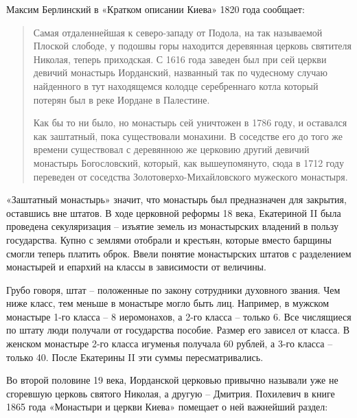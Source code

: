 Максим Берлинский в «Кратком описании Киева» 1820 года сообщает:

\begin{quotation}
Самая отдаленнейшая к северо-западу от Подола, на так называемой Плоской слободе, у подошвы горы находится деревянная церковь святителя Николая, теперь приходская. С 1616 года заведен был при сей церкви девичий монастырь Иорданский, названный так по чудесному случаю найденного в тут находящемся колодце серебреннаго котла который потерян был в реке Иордане в Палестине. 

Как бы то ни было, но монастырь сей уничтожен в 1786  году, и оставался как заштатный, пока существовали монахини. В соседстве его до того же времени существовал с деревянною же церковию другий девичий монастырь Богословский, который, как вышеупомянуто, сюда в 1712 году переведен от соседства Золотоверхо-Михайловского мужеского монастыря.
\end{quotation}

«Заштатный монастырь» значит, что монастырь был предназначен для закрытия, оставшись вне штатов. В ходе церковной реформы 18 века, Екатериной II была проведена секуляризация – изъятие земель из монастырских владений в пользу государства. Купно с землями отобрали и крестьян, которые вместо барщины смогли теперь платить оброк. Ввели понятие монастырских штатов с разделением монастырей и епархий на классы в зависимости от величины. 

Грубо говоря, штат – положенные по закону сотрудники духовного звания. Чем ниже класс, тем меньше в монастыре могло быть лиц. Например, в мужском монастыре 1-го класса – 8 иеромонахов, а 2-го класса – только 6. Все числящиеся по штату люди получали от государства пособие. Размер его зависел от класса. В женском монастыре 2-го класса игуменья получала 60 рублей, а 3-го класса – только 40. После Екатерины II эти суммы пересматривались.

Во второй половине 19 века, Иорданской церковью привычно называли уже не сгоревшую церковь святого Николая, а другую – Дмитрия. Похилевич в книге 1865 года «Монастыри и церкви Киева» помещает о ней важнейший раздел:


